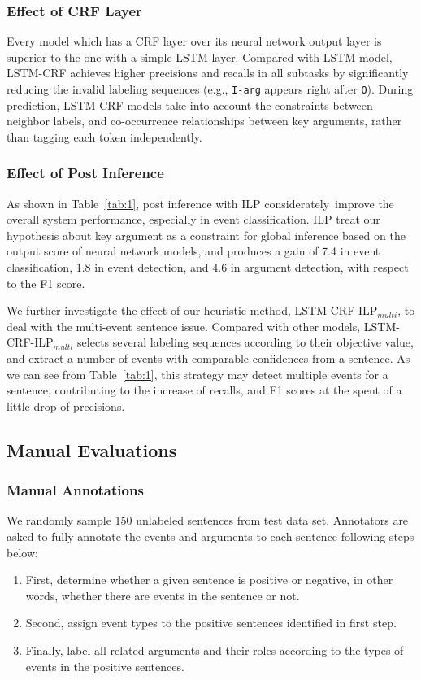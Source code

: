 \documentclass{article}
\begin{document}
\subsubsection{Effect of CRF Layer}
Every model which has a CRF layer over its neural network output layer is superior to the one with a simple LSTM layer. Compared with LSTM model, LSTM-CRF achieves higher precisions and recalls in all subtasks by significantly reducing the invalid labeling sequences (e.g., \texttt{I-arg} appears right after \texttt{O}). During prediction, LSTM-CRF models take into account the constraints between neighbor labels, and co-occurrence relationships between key arguments, rather than tagging each token independently.
 
\subsubsection{Effect of Post Inference}
As shown in Table~\ref{tab:1}, post inference with ILP considerately improve the overall system performance, especially in event classification. ILP treat our hypothesis about key argument as a constraint for global inference based on the output score of neural network models, and produces a gain of 7.4 in event classification, 1.8 in event detection, and 4.6 in argument detection, with respect to the F1 score.

We further investigate the effect of our heuristic method, LSTM-CRF-ILP$_{multi}$, to deal with the multi-event sentence issue. Compared with other models, LSTM-CRF-ILP$_{multi}$ selects several labeling sequences according to their objective value, and extract a number of events with comparable confidences from a sentence. As we can see from Table~\ref{tab:1}, this strategy may detect multiple events for a sentence, contributing to the increase of recalls, and F1 scores at the spent of a little drop of precisions. 

\subsection{Manual Evaluations}
\subsubsection{Manual Annotations}
We randomly sample 150 unlabeled sentences from test data set. Annotators are asked to fully annotate the events and arguments to each sentence following steps below: 

\begin{enumerate}
	\item First, determine whether a given sentence is positive or negative, in other words, whether there are events in the sentence or not.
	\item Second, assign event types to the positive sentences identified in first step.
	\item Finally, label all related arguments and their roles according to the types of events in the positive sentences.
\end{enumerate}
\end{document}
